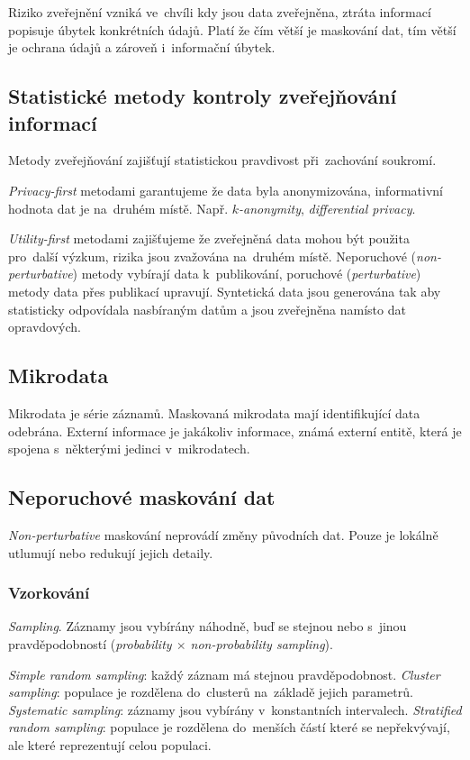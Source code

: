 Riziko zveřejnění vzniká ve~chvíli kdy jsou data zveřejněna, ztráta informací popisuje úbytek konkrétních údajů.
Platí že čím větší je maskování dat, tím větší je ochrana údajů a zároveň i~informační úbytek.


\subsection{Statistické metody kontroly zveřejňování informací}

Metody zveřejňování zajišťují statistickou pravdivost při~zachování soukromí.

\emph{Privacy-first} metodami garantujeme že data byla anonymizována, informativní hodnota dat je na~druhém místě.
Např. \emph{$k$-anonymity}, \emph{differential privacy}.

\emph{Utility-first} metodami zajišťujeme že zveřejněná data mohou být použita pro~další výzkum, rizika jsou zvažována na~druhém místě.
Neporuchové (\emph{non-perturbative}) metody vybírají data k~publikování, poruchové (\emph{perturbative}) metody data přes publikací upravují.
Syntetická data jsou generována tak aby statisticky odpovídala nasbíraným datům a jsou zveřejněna namísto dat opravdových.


\subsection{Mikrodata}

Mikrodata je série záznamů.
Maskovaná mikrodata mají identifikující data odebrána.
Externí informace je jakákoliv informace, známá externí entitě, která je spojena s~některými jedinci v~mikrodatech.


\subsection{Neporuchové maskování dat}

\emph{Non-perturbative} maskování neprovádí změny původních dat.
Pouze je lokálně utlumují nebo redukují jejich detaily.


\subsubsection*{Vzorkování}

\emph{Sampling}.
Záznamy jsou vybírány náhodně, buď se stejnou nebo s~jinou pravděpodobností (\emph{probability $\times$ non-probability sampling}).

\emph{Simple random sampling}: každý záznam má stejnou pravděpodobnost.
\emph{Cluster sampling}: populace je rozdělena do~clusterů na~základě jejich parametrů.
\emph{Systematic sampling}: záznamy jsou vybírány v~konstantních intervalech.
\emph{Stratified random sampling}: populace je rozdělena do~menších částí které se nepřekvývají, ale které reprezentují celou populaci.


